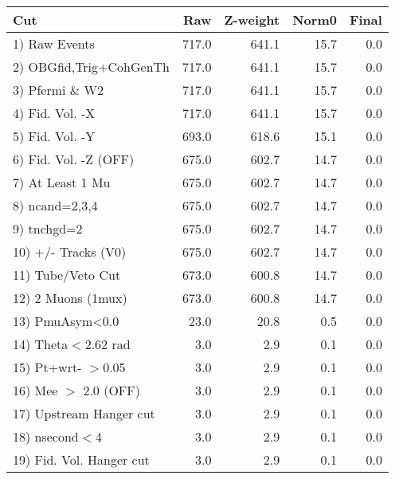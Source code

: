  \begin{table}[h!]\centering
 \begin{tabular}{||l||r|r|r|r||}
 \hline
 \hline
 Cut & Raw & Z-weight & Norm0 & Final \\
 \hline
  1) Raw Events           &       717.0 &       641.1 &        15.7 &         0.0 \\
  2) OBGfid,Trig+CohGenTh &       717.0 &       641.1 &        15.7 &         0.0 \\
  3) Pfermi \& W2         &       717.0 &       641.1 &        15.7 &         0.0 \\
  4) Fid. Vol. -X         &       717.0 &       641.1 &        15.7 &         0.0 \\
  5) Fid. Vol. -Y         &       693.0 &       618.6 &        15.1 &         0.0 \\
  6) Fid. Vol. -Z (OFF)   &       675.0 &       602.7 &        14.7 &         0.0 \\
  7) At Least 1 Mu        &       675.0 &       602.7 &        14.7 &         0.0 \\
  8) ncand=2,3,4          &       675.0 &       602.7 &        14.7 &         0.0 \\
  9) tnchgd=2             &       675.0 &       602.7 &        14.7 &         0.0 \\
 10) +/- Tracks (V0)      &       675.0 &       602.7 &        14.7 &         0.0 \\
 11) Tube/Veto Cut        &       673.0 &       600.8 &        14.7 &         0.0 \\
 12) 2 Muons (1mux)       &       673.0 &       600.8 &        14.7 &         0.0 \\
 13) PmuAsym<0.0          &        23.0 &        20.8 &         0.5 &         0.0 \\
 14) Theta$<$2.62 rad     &         3.0 &         2.9 &         0.1 &         0.0 \\
 15) Pt+wrt- $>$0.05      &         3.0 &         2.9 &         0.1 &         0.0 \\
 16) Mee $>$ 2.0  (OFF)   &         3.0 &         2.9 &         0.1 &         0.0 \\
 17) Upstream Hanger cut  &         3.0 &         2.9 &         0.1 &         0.0 \\
 18) nsecond$<$4          &         3.0 &         2.9 &         0.1 &         0.0 \\
 19) Fid. Vol. Hanger cut &         3.0 &         2.9 &         0.1 &         0.0 \\

\end{tabular}
\end{table}
